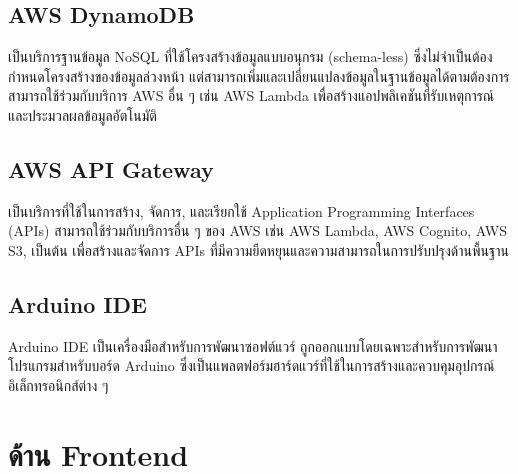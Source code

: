 \subsection{AWS DynamoDB}
เป็นบริการฐานข้อมูล NoSQL ที่ใช้โครงสร้างข้อมูลแบบอนุกรม (schema-less) ซึ่งไม่จำเป็นต้องกำหนดโครงสร้างของข้อมูลล่วงหน้า แต่สามารถเพิ่มและเปลี่ยนแปลงข้อมูลในฐานข้อมูลได้ตามต้องการ สามารถใช้ร่วมกับบริการ AWS อื่น ๆ เช่น AWS Lambda เพื่อสร้างแอปพลิเคชันที่รับเหตุการณ์และประมวลผลข้อมูลอัตโนมัติ
\cite{AWS}
\subsection{AWS API Gateway}
เป็นบริการที่ใช้ในการสร้าง, จัดการ, และเรียกใช้ Application Programming Interfaces (APIs) สามารถใช้ร่วมกับบริการอื่น ๆ ของ AWS เช่น AWS Lambda, AWS Cognito, AWS S3, เป็นต้น เพื่อสร้างและจัดการ APIs ที่มีความยืดหยุนและความสามารถในการปรับปรุงด้านพื้นฐาน
\cite{AWS}
\subsection{Arduino IDE}
Arduino IDE เป็นเครื่องมือสำหรับการพัฒนาซอฟต์แวร์ ถูกออกแบบโดยเฉพาะสำหรับการพัฒนาโปรแกรมสำหรับบอร์ด Arduino ซึ่งเป็นแพลตฟอร์มฮาร์ดแวร์ที่ใช้ในการสร้างและควบคุมอุปกรณ์อิเล็กทรอนิกส์ต่าง ๆ
\cite{AWS}


\section{ด้าน Frontend}

